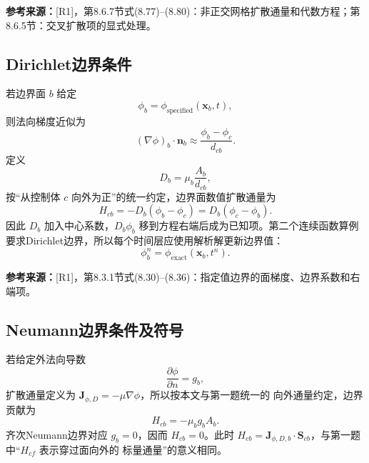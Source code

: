 \documentclass[UTF8,12pt,a4paper]{ctexart}
\numberwithin{equation}{section}
\newcommand{\Rone}{\textnormal{[R1]}}
\newcommand{\source}[1]{%
  \par\smallskip
  \noindent\colorbox{sourcebg}{%
    \parbox{0.955\linewidth}{\raggedright\footnotesize\color{sourcegray}\textbf{参考来源：}#1}%
  }
  \par\smallskip
}
\newcommand{\Sf}{\bm S}
\newcommand{\xf}{\bm x}
\begin{document}
\source{\Rone，第8.6.7节式(8.77)--(8.80)：非正交网格扩散通量和代数方程；第8.6.5节：交叉扩散项的显式处理。}

\subsection{Dirichlet边界条件}

若边界面 $b$ 给定
\begin{equation}
  \phi_b=\phi_{\mathrm{specified}}(\xf_b,t),
  \label{eq:dirichlet_value}
\end{equation}
则法向梯度近似为
\begin{equation}
  (\nabla\phi)_b\cdot\bm n_b
  \approx\frac{\phi_b-\phi_c}{d_{cb}}.
  \label{eq:dirichlet_gradient}
\end{equation}
定义
\begin{equation}
  D_b=\mu_b\frac{A_b}{d_{cb}},
  \label{eq:boundary_D}
\end{equation}
按“从控制体 $c$ 向外为正”的统一约定，边界面数值扩散通量为
\begin{equation}
  \boxed{
  H_{cb}=-D_b(\phi_b-\phi_c)
  =D_b(\phi_c-\phi_b)}.
  \label{eq:dirichlet_flux}
\end{equation}
因此 $D_b$ 加入中心系数，$D_b\phi_b$ 移到方程右端后成为已知项。第二个连续函数算例要求Dirichlet边界，所以每个时间层应使用解析解更新边界值：
\begin{equation}
  \phi_b^n=\phi_{\mathrm{exact}}(\xf_b,t^n).
  \label{eq:time_dirichlet}
\end{equation}

\source{\Rone，第8.3.1节式(8.30)--(8.36)：指定值边界的面梯度、边界系数和右端项。}

\subsection{Neumann边界条件及符号}

若给定外法向导数
\begin{equation}
  \frac{\partial\phi}{\partial n}=g_b,
  \label{eq:neumann_gradient}
\end{equation}
扩散通量定义为 $\bm J_{\phi,D}=-\mu\nabla\phi$，所以按本文与第一题统一的
向外通量约定，边界贡献为
\begin{equation}
  \boxed{H_{cb}=-\mu_bg_bA_b}.
  \label{eq:neumann_flux}
\end{equation}
齐次Neumann边界对应 $g_b=0$，因而 $H_{cb}=0$。此时
$H_{cb}=\bm J_{\phi,D,b}\cdot\Sf_{cb}$，与第一题中“$H_{cf}$ 表示穿过面向外的
标量通量”的意义相同。
\end{document}
